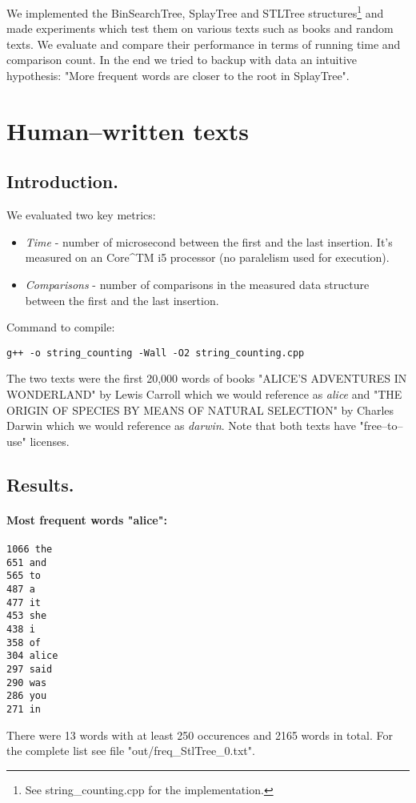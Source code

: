 \documentclass[12pt,a4paper]{article}
\begin{document}
We implemented the BinSearchTree, SplayTree and STLTree structures\footnote{See string_counting.cpp for the implementation.
} and made experiments which test them on various texts such as books and random texts. We evaluate and compare their performance in terms of running time and comparison count. In the end we tried to backup with data an intuitive hypothesis: "More frequent words are closer to the root in SplayTree". 


\section{Human--written texts} 
\subsection{Introduction.} 
We evaluated two key metrics:
\begin{itemize} 
\item \emph{Time} - number of microsecond between the first and the last insertion. It's measured on an  Core^{TM} i5 processor (no paralelism used for execution). 
\item \emph{Comparisons} - number of comparisons in the measured data structure between the first and the last insertion. 
\end{itemize}

Command to compile: 
\begin{lstlisting}
g++ -o string_counting -Wall -O2 string_counting.cpp
\end{lstlisting}

The two texts were the first 20,000 words of books "ALICE'S ADVENTURES IN WONDERLAND" by Lewis Carroll which we would reference as \emph{alice} and "THE ORIGIN OF SPECIES BY MEANS OF NATURAL SELECTION" by Charles Darwin which we would reference as \emph{darwin}. Note that both texts have "free--to--use" licenses. 

\subsection{Results.} 
\paragraph{Most frequent words "alice":}
\begin{lstlisting}
1066 the
651 and
565 to
487 a
477 it
453 she
438 i
358 of
304 alice
297 said
290 was
286 you
271 in
\end{lstlisting}
There were 13 words with at least 250 occurences and 2165 words in total. 
For the complete list see file "out/freq_StlTree_0.txt". 
\end{document}
